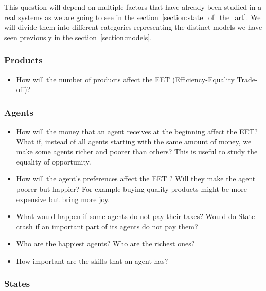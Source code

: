 \documentclass[20pt]{article}
\begin{document}
\vspace*{0.5cm}

This question will depend on multiple factors that have already been studied in a real systems as we are going to see in the  section~\ref{section:state_of_the_art}. We will divide them into different categories representing the distinct models we have seen previously in the section~\ref{section:models}. 

\subsubsection{Products}

\begin{itemize}
    \item How will the number of products affect the EET (Efficiency-Equality Trade-off)?
\end{itemize}


\subsubsection{Agents}

\begin{itemize}
    \item How will the money that an agent receives at the beginning affect the EET? What if, instead of all agents starting with the same amount of money, we make some agents richer and poorer than others? This is useful to study the equality of opportunity.
    \item How will the agent's preferences affect the EET ? Will they make the agent poorer but happier? For example buying quality products might be more expensive but bring more joy.
    \item What would happen if some agents do not pay their taxes? Would do State crash if an important part of its agents do not pay them?
    \item Who are the happiest agents? Who are the richest ones?
    \item How important are the skills that an agent has? 
\end{itemize}

\subsubsection{States}
\end{document}
